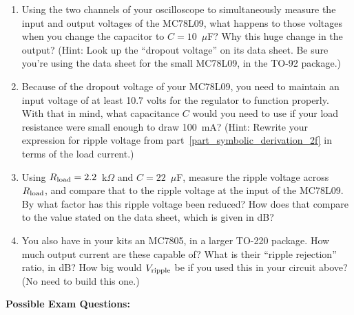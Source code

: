 \begin{enumerate}[wide]
\item Using the two channels of your oscilloscope to simultaneously measure the input and output voltages of the MC78L09, what happens to those voltages when you change the capacitor to $C = 10$~$\mu$F?  Why this huge change in the output?  (Hint: Look up the ``dropout voltage'' on its data sheet.  Be sure you're using the data sheet for the small MC78L09, in the TO-92 package.)

\item Because of the dropout voltage of your MC78L09, you need to maintain an input voltage of at least 10.7 volts for the regulator to function properly.  With that in mind, what capacitance $C$ would you need to use if your load resistance were small enough to draw 100~mA?   (Hint: Rewrite your expression for ripple voltage from part~\ref{part_symbolic_derivation_2f} in terms of the load current.)

\item Using $R_{\rm load} = 2.2$~k$\Omega$ and $C = 22$~$\mu$F, measure the ripple voltage across $R_{\rm load}$, and compare that to the ripple voltage at the input of the MC78L09.  By what factor has this ripple voltage been reduced?  How does that compare to the value stated on the data sheet, which is given in dB?

\item You also have in your kits an MC7805, in a larger TO-220 package.  How much output current are these capable of?  What is their ``ripple rejection'' ratio, in dB?  How big would $V_{\rm ripple}$ be if you used this in your circuit above?  (No need to build this one.)

\end{enumerate}

\textbf{Possible Exam Questions:}

